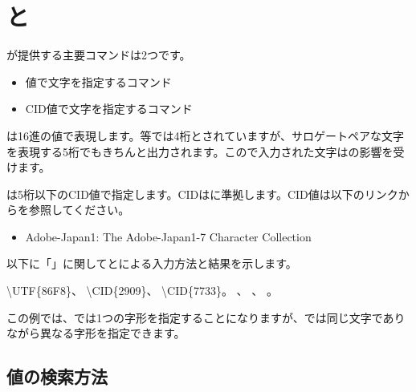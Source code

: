 \documentclass[../otf-unofficial-guide]{subfiles}
\begin{document}
\section{\texorpdfstring{と}{{\textbackslash}UTFと{\textbackslash}CID}}

が提供する主要コマンドは2つです。

\begin{itemize}
  \item {}
         {\Unicode}値で文字を指定するコマンド
  \item {}
         CID値で文字を指定するコマンド
\end{itemize}

は16進の{\Unicode}値で表現します。{\TeXWiki}等では4桁とされていますが、サロゲートペアな文字を表現する5桁でもきちんと出力されます。こので入力された文字はの影響を受けます。

は5桁以下のCID値で指定します。CIDは{\AdobeJapan}に準拠します。CID値は以下のリンクからを参照してください。

\begin{itemize}
  \item Adobe-Japan1: The Adobe-Japan1-7 Character Collection
\end{itemize}

以下に「」に関してとによる入力方法と結果を示します。

\begin{demosource}
  {\textbackslash}UTF\{86F8\}、
  {\textbackslash}CID\{2909\}、
  {\textbackslash}CID\{7733\}。
  \tcblower
  \large
  、
  、
  。
\end{demosource}

この例では、では1つの字形を指定することになりますが、では同じ文字でありながら異なる字形を指定できます。

\subsection{{\Unicode}値の検索方法}
\end{document}
